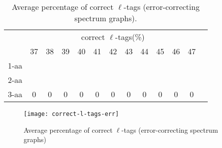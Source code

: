 \documentclass{article}[12pt]
\begin{document}
\begin{landscape}
\begin{table}[h]
\vspace{3mm}
\end{table}
\begin{table}[h]\tiny
\vspace{3mm}
{\centering
\begin{center}
\begin{tabular}{|l|c|c|c|c|c|c|c|c|c|c|c|c|}
  \hline
  & \multicolumn{ 11 }{|c|}{correct $\ell$-tags(\%)} \\
  \cline{2- 12}
    & 37 & 38 & 39 & 40 & 41 & 42 & 43 & 44 & 45 & 46 & 47\\
  \hline
1-aa  &  &  &  &  &  &  &  &  &  &  & \\
2-aa  &  &  &  &  &  &  &  &  &  &  & \\
3-aa  & 0 & 0 & 0 & 0 & 0 & 0 & 0 & 0 & 0 & 0 & 0\\
 \hline
\end{tabular}
\end{center}
\par}
\centering

\caption{ Average percentage of correct $\ell$-tags (error-correcting spectrum graphs).}
\label{table:correct-l-tags-err}

\vspace{3mm}
\end{table}
\end{landscape}

\begin{figure}
  \begin{center}
\texttt{[image: correct-l-tags-err]}
\end{center}
\caption{Average percentage of correct $\ell$-tags (error-correcting spectrum graphs)}
  \label{fig:correct-l-tags-err}
\end{figure}
\end{document}
